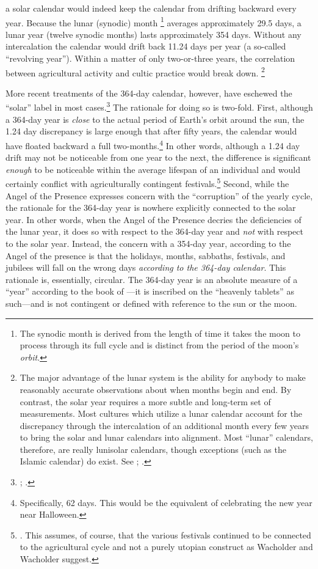 a solar calendar would indeed keep the calendar from drifting backward every year. Because the lunar (synodic) month%
    \footnote{The synodic month is derived from the length of time it takes the moon to process through its full cycle and is distinct from the period of the moon's \emph{orbit}.}
averages approximately 29.5 days, a lunar year (twelve synodic months) lasts approximately 354 days. Without any intercalation the calendar would drift back 11.24 days per year (a so-called ``revolving year''). Within a matter of only two-or-three years, the correlation between agricultural activity and cultic practice would break down.%
    \footnote{The major advantage of the lunar system is the ability for anybody to make reasonably accurate observations about when months begin and end. By contrast, the solar year requires a more subtle and long-term set of measurements. Most cultures which utilize a lunar calendar account for the discrepancy through the intercalation of an additional month every few years to bring the solar and lunar calendars into alignment. Most ``lunar'' calendars, therefore, are really lunisolar calendars, though exceptions (such as the Islamic calendar) do exist. See \cite[214, 238]{glessmer_flint-vanderkam1999}; \cite[37--38]{horowitz_janes1996}.}

More recent treatments of the 364-day calendar, however, have eschewed the ``solar'' label in most cases.\footnote{\cite[231]{glessmer_flint-vanderkam1999}\cite[80]{bendov_steele2011}; \cite[438]{jacobus_brooke-hempell2018}.} The rationale for doing so is two-fold. First, although a 364-day year is \emph{close} to the actual period of Earth's orbit around the sun, the 1.24 day discrepancy is large enough that after fifty years, the calendar would have floated backward a full two-months.\footnote{Specifically, 62 days. This would be the equivalent of celebrating the new year near Halloween.} In other words, although a 1.24 day drift may not be noticeable from one year to the next, the difference is significant \emph{enough} to be noticeable within the average lifespan of an individual and would certainly conflict with agriculturally contingent festivals.\footnote{\cite[28--37]{wacholder-wacholder_huca1995}. This assumes, of course, that the various festivals continued to be connected to the agricultural cycle and not a purely utopian construct as Wacholder and Wacholder suggest.} Second, while the Angel of the Presence expresses concern with the ``corruption'' of the yearly cycle, the rationale for the 364-day year is nowhere explicitly connected to the solar year. In other words, when the Angel of the Presence decries the deficiencies of the lunar year, it does so with respect to the 364-day year and \emph{not} with respect to the solar year. Instead, the concern with a 354-day year, according to the Angel of the presence is that the holidays, months, sabbaths, festivals, and jubilees will fall on the wrong days \emph{according to the 364-day calendar}. This rationale is, essentially, circular. The 364-day year is an absolute measure of a ``year'' according to the book of \jub---it is inscribed on the ``heavenly tablets'' as such---and is not contingent or defined with reference to the sun or the moon.

